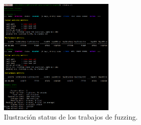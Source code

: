 \begin{figure}[htbp]
     \centering
    \includegraphics[width=0.5\textwidth]{./figures/data/Image_fuzzer_status_HOUSE.png}
    \caption{Ilustración status de los trabajos de fuzzing.}
    \label{img:fuzzer_status}
\end{figure}
